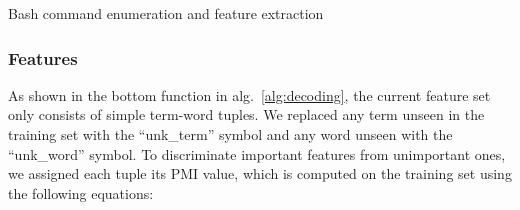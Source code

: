 \begin{algorithm} [ht]
\caption{Bash command enumeration and feature extraction\label{alg:decoding}}

\end{algorithm}

\subsubsection{Features}
\label{subsec:feature}
As shown in the bottom function in alg.~\ref{alg:decoding}, the current feature set only consists of simple term-word tuples. We replaced any term unseen in the training set with the ``unk\_term'' symbol and any word unseen with the ``unk\_word'' symbol. To discriminate important features from unimportant ones, we assigned each tuple its PMI value, which is computed on the training set using the following equations:

